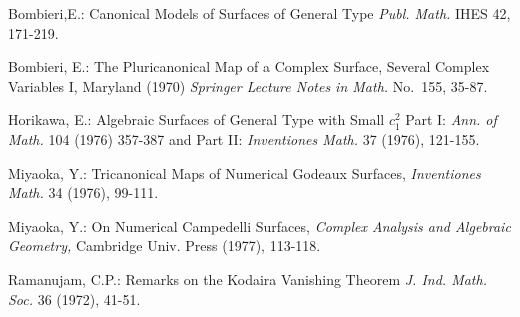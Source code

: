 \begin{thebibliography}{99}
 Bombieri,\pageoriginale E.: Canonical Models of
Surfaces of General Type {\em Publ. Math.} IHES 42, 171-219.

 Bombieri, E.: The Pluricanonical Map of a Complex
Surface, Several Complex Variables I, Maryland (1970) {\em Springer
Lecture Notes in Math.} No.~155, 35-87.

 Horikawa, E.: Algebraic Surfaces of General Type
with Small $c^{2}_{1}$ Part I: {\em Ann. of Math.} 104 (1976) 357-387
and Part II: {\em Inventiones Math.} 37 (1976), 121-155.

 Miyaoka, Y.: Tricanonical Maps of Numerical
Godeaux Surfaces, {\em Inventiones Math.} 34 (1976), 99-111.

 Miyaoka, Y.: On Numerical Campedelli Surfaces,
{\em Complex Analysis and Algebraic Geometry,} Cambridge Univ. Press
(1977), 113-118.

 Ramanujam, C.P.: Remarks on the Kodaira Vanishing
Theorem {\em J. Ind. Math. Soc.} 36 (1972), 41-51.

\end{thebibliography}










